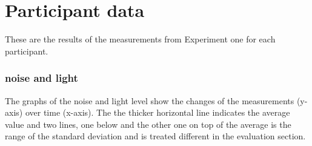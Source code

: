 \chapter{Participant data}

These are the results of the measurements from Experiment one for each participant. 

\subsection{noise and light}
The graphs of the noise and light level show the changes of the measurements (y-axis) over time (x-axis). 
The the thicker horizontal line indicates the average value and two lines, one below and the other one on top of the average is the range of the standard deviation and is treated different in the evaluation section.

\clearpage

\clearpage

\clearpage

\clearpage

\clearpage
